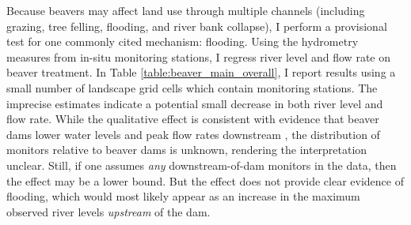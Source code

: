 Because beavers may affect land use through multiple channels (including grazing, tree felling, flooding, and river bank collapse), I perform a provisional test for one commonly cited mechanism: flooding. Using the hydrometry measures from in-situ monitoring stations, I regress river level and flow rate on beaver treatment. In Table \ref{table:beaver_main_overall}, I report results using a small number of landscape grid cells which contain monitoring stations. The imprecise estimates indicate a potential small decrease in both river level and flow rate. While the qualitative effect is consistent with evidence that beaver dams lower water levels and peak flow rates downstream \citep{swinnen_environmental_2019}, the distribution of monitors relative to beaver dams is unknown, rendering the interpretation unclear. Still, if one assumes \textit{any} downstream-of-dam monitors in the data, then the effect may be a lower bound. But the effect does not provide clear evidence of flooding, which would most likely appear as an increase in the maximum observed river levels \textit{upstream} of the dam. 


